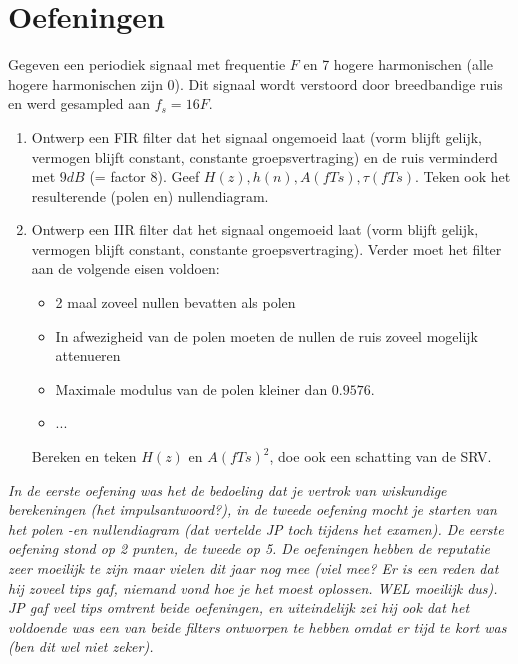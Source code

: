 \documentclass[a4paper]{article}
\begin{document}
\section{Oefeningen}
Gegeven een periodiek signaal met frequentie $F$ en 7 hogere harmonischen (alle hogere harmonischen zijn 0). Dit signaal wordt verstoord door breedbandige ruis en werd gesampled aan $f_s=16F$. 
\begin{enumerate}
	\item Ontwerp een FIR filter dat het signaal ongemoeid laat (vorm blijft gelijk, vermogen blijft constant, constante groepsvertraging) en de ruis verminderd met $9dB$ (= factor 8). Geef $H(z), h(n), A(fTs), \tau(fTs)$. Teken ook het resulterende (polen en) nullendiagram.
	\item Ontwerp een IIR filter dat het signaal ongemoeid laat (vorm blijft gelijk, vermogen blijft constant, constante groepsvertraging). Verder moet het filter aan de volgende eisen voldoen:
	\begin{itemize}
		\item 2 maal zoveel nullen bevatten als polen
		\item In afwezigheid van de polen moeten de nullen de ruis zoveel mogelijk attenueren
		\item Maximale modulus van de polen kleiner dan $0.9576$.
		\item ...
	\end{itemize}
	Bereken en teken $H(z)$ en $A(fTs)^2$, doe ook een schatting van de SRV.
\end{enumerate}

\textit{In de eerste oefening was het de bedoeling dat je vertrok van wiskundige berekeningen (het impulsantwoord?), in de tweede oefening mocht je starten van het polen -en nullendiagram (dat vertelde JP toch tijdens het examen).
De eerste oefening stond op 2 punten, de tweede op 5. De oefeningen hebben de reputatie zeer moeilijk te zijn maar vielen dit jaar nog mee (viel mee? Er is een reden dat hij zoveel tips gaf, niemand vond hoe je het moest oplossen. WEL moeilijk dus). JP gaf veel tips omtrent beide oefeningen, en uiteindelijk zei hij ook dat het voldoende was een van beide filters ontworpen te hebben omdat er tijd te kort was (ben dit wel niet zeker).}
\end{document}

